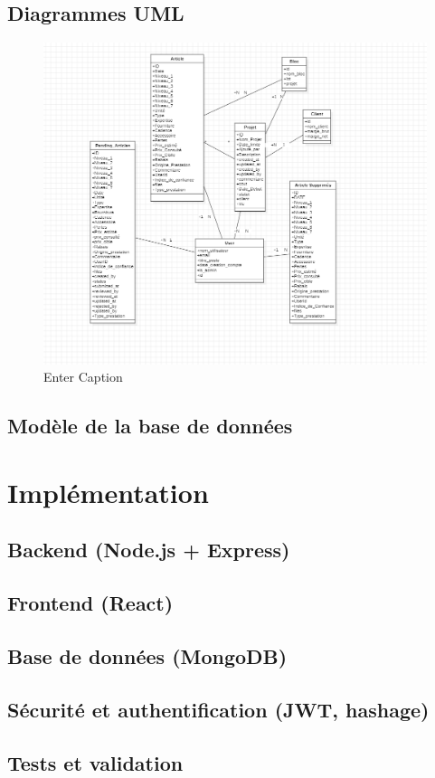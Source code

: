 \documentclass[12pt,a4paper]{report}
\begin{document}
\section{Diagrammes UML}

\begin{figure}[H]
    \centering
    \includegraphics[width=0.5\linewidth]{image.png}
    \caption{Enter Caption}
    \label{fig:placeholder}
\end{figure}

\section{Modèle de la base de données}

\chapter{Implémentation}
\section{Backend (Node.js + Express)}
\section{Frontend (React)}
\section{Base de données (MongoDB)}
\section{Sécurité et authentification (JWT, hashage)}
\section{Tests et validation}

\end{document}

